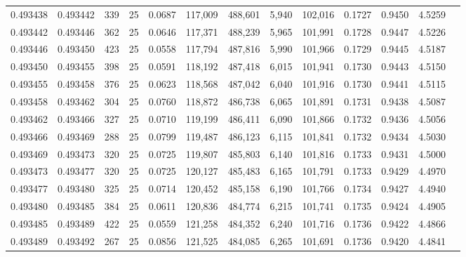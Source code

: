 \begin{tabular}{rrrrrrrrrrrrr}
0.493438 & 0.493442 &   339 &  25 &                                     0.0687 & 117,009 & 488,601 &   5,940 & 102,016 & 0.1727 & 0.9450 & 4.5259 \\
0.493442 & 0.493446 &   362 &  25 &                                     0.0646 & 117,371 & 488,239 &   5,965 & 101,991 & 0.1728 & 0.9447 & 4.5226 \\
0.493446 & 0.493450 &   423 &  25 &                                     0.0558 & 117,794 & 487,816 &   5,990 & 101,966 & 0.1729 & 0.9445 & 4.5187 \\
0.493450 & 0.493455 &   398 &  25 &                                     0.0591 & 118,192 & 487,418 &   6,015 & 101,941 & 0.1730 & 0.9443 & 4.5150 \\
0.493455 & 0.493458 &   376 &  25 &                                     0.0623 & 118,568 & 487,042 &   6,040 & 101,916 & 0.1730 & 0.9441 & 4.5115 \\
0.493458 & 0.493462 &   304 &  25 &                                     0.0760 & 118,872 & 486,738 &   6,065 & 101,891 & 0.1731 & 0.9438 & 4.5087 \\
0.493462 & 0.493466 &   327 &  25 &                                     0.0710 & 119,199 & 486,411 &   6,090 & 101,866 & 0.1732 & 0.9436 & 4.5056 \\
0.493466 & 0.493469 &   288 &  25 &                                     0.0799 & 119,487 & 486,123 &   6,115 & 101,841 & 0.1732 & 0.9434 & 4.5030 \\
0.493469 & 0.493473 &   320 &  25 &                                     0.0725 & 119,807 & 485,803 &   6,140 & 101,816 & 0.1733 & 0.9431 & 4.5000 \\
0.493473 & 0.493477 &   320 &  25 &                                     0.0725 & 120,127 & 485,483 &   6,165 & 101,791 & 0.1733 & 0.9429 & 4.4970 \\
0.493477 & 0.493480 &   325 &  25 &                                     0.0714 & 120,452 & 485,158 &   6,190 & 101,766 & 0.1734 & 0.9427 & 4.4940 \\
0.493480 & 0.493485 &   384 &  25 &                                     0.0611 & 120,836 & 484,774 &   6,215 & 101,741 & 0.1735 & 0.9424 & 4.4905 \\
0.493485 & 0.493489 &   422 &  25 &                                     0.0559 & 121,258 & 484,352 &   6,240 & 101,716 & 0.1736 & 0.9422 & 4.4866 \\
0.493489 & 0.493492 &   267 &  25 &                                     0.0856 & 121,525 & 484,085 &   6,265 & 101,691 & 0.1736 & 0.9420 & 4.4841 \\

\end{tabular}
